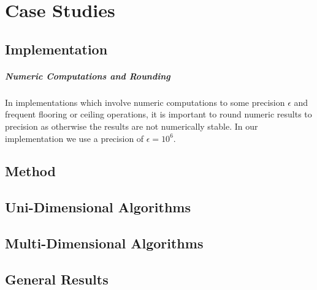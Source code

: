 
\chapter{Case Studies}\label{chapter:experiments}

\section{Implementation}

\paragraph{Numeric Computations and Rounding} In implementations which involve numeric computations to some precision $\epsilon$ and frequent flooring or ceiling operations, it is important to round numeric results to precision as otherwise the results are not numerically stable. In our implementation we use a precision of $\epsilon = 10^6$.

\section{Method}

\section{Uni-Dimensional Algorithms}

\section{Multi-Dimensional Algorithms}

\section{General Results}
